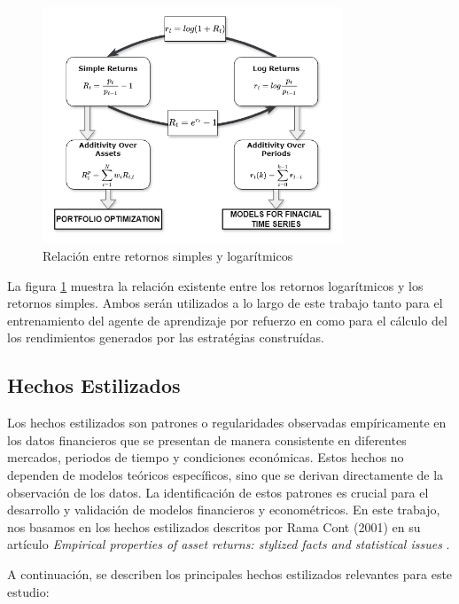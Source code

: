 \documentclass[a4paper,12pt, twoside]{report}
\begin{document}
\begin{figure}[H]
    \centering
    \includegraphics[width=0.8\textwidth]{figures/simple_and_log_ret_relation.png}
    \caption{Relación entre retornos simples y logarítmicos}
    \label{fig:log-returns}
\end{figure}

La figura \ref{fig:log-returns} muestra la relación existente entre los retornos logarítmicos y los retornos simples.
Ambos serán utilizados a lo largo de este trabajo tanto para el entrenamiento del agente de aprendizaje por refuerzo en
como para el cálculo del los rendimientos generados por las estratégias construídas.

\subsection{Hechos Estilizados}

Los hechos estilizados son patrones o regularidades observadas empíricamente en los datos financieros que se 
presentan de manera consistente en diferentes mercados, periodos de tiempo y condiciones económicas. Estos hechos 
no dependen de modelos teóricos específicos, sino que se derivan directamente de la observación de los datos. La 
identificación de estos patrones es crucial para el desarrollo y validación de modelos financieros y econométricos. 
En este trabajo, nos basamos en los hechos estilizados descritos por Rama Cont (2001) en su artículo \textit{Empirical 
properties of asset returns: stylized facts and statistical issues} \cite{Cont2001}.

A continuación, se describen los principales hechos estilizados relevantes para este estudio:
\end{document}

